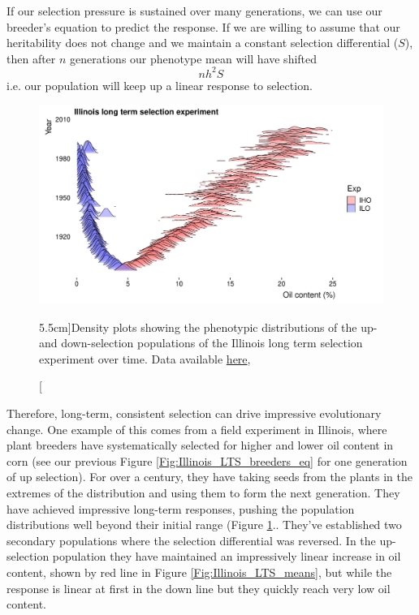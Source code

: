 If our selection pressure is sustained over many generations, we can
use our breeder's equation to predict the response. If we are willing
to assume that our heritability does not change and we maintain a constant selection
differential ($S$), then after $n$ generations our phenotype mean will have
shifted 
\begin{equation}
n h^2 S
\end{equation}
i.e. our population will keep up a linear response to selection.
 \begin{figure}
 \begin{center}
   \includegraphics[width=\textwidth]{Journal_figs/Quant_gen/Illinois_long_term_selection_corn/Illinois_LTS_ggridges_distribution.pdf}\end{center}
 \caption[][5.5cm]{Density plots showing the phenotypic distributions of the
   up- and down-selection populations of the Illinois long term
   selection experiment over time. Data available
   \href{https://www.ideals.illinois.edu/handle/2142/3525}{here}, }\label{Fig:Illinois_LTS_dists}
 \end{figure}
Therefore, long-term, consistent selection can drive impressive
evolutionary change. One example of this comes from a field experiment
in Illinois, where plant breeders have systematically selected for
higher and lower oil content in corn (see our previous Figure
\ref{Fig:Illinois_LTS_breeders_eq} for one generation of up selection). For over a century, they have taking seeds from the plants
in the extremes of the distribution and using them to form the next
generation. They have achieved impressive long-term responses, pushing
the population distributions well beyond their initial range (Figure \ref{Fig:Illinois_LTS_dists}.. They've established
two secondary populations where the selection differential was reversed. In the up-selection population they have maintained an
impressively linear increase in oil content, shown by red line in
Figure \ref{Fig:Illinois_LTS_means}, but while the
response is linear at first in the down line but they quickly reach
very low oil content.

